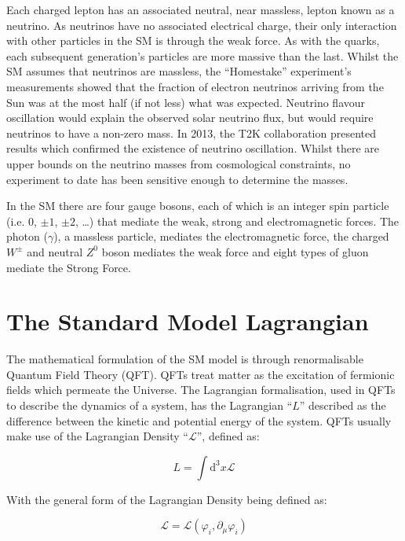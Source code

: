 Each charged lepton has an associated neutral, near massless, lepton known as a neutrino. 
As neutrinos have no associated electrical charge, their only interaction with other particles in the SM is through the weak force. 
As with the quarks, each subsequent generation's particles are more massive than the last. 
Whilst the SM assumes that neutrinos are massless, the ``Homestake'' experiment's measurements showed that the fraction of electron neutrinos arriving from the Sun was at the most half (if not less) what was expected\cite{PhysRevLett.20.1205}. 
Neutrino flavour oscillation would explain the observed solar neutrino flux, but would require neutrinos to have a non-zero mass. 
In 2013, the T2K collaboration presented results which confirmed the existence of neutrino oscillation\cite{PhysRevD.88.032002}. 
Whilst there are upper bounds on the neutrino masses from cosmological constraints, no experiment to date has been sensitive enough to determine the masses\cite{1475-7516-2006-06-019}. 

In the SM there are four gauge bosons, each of which is an integer spin particle (i.e. 0, $\pm 1$, $\pm 2$, …) that mediate the weak, strong and electromagnetic forces. 
The photon ($\gamma$), a massless particle, mediates the electromagnetic force, the charged $W^\pm$ and neutral $Z^0$ boson mediates the weak force and eight types of gluon mediate the Strong Force\cite{LagrangiansSM}. 

\section{The Standard Model Lagrangian}\label{sec:sm-langrangian}

The mathematical formulation of the SM model is through renormalisable Quantum Field Theory (QFT)\cite{LagrangiansSM}. 
QFTs treat matter as the excitation of fermionic fields which permeate the Universe. 
The Lagrangian formalisation, used in QFTs to describe the dynamics of a system, has the Lagrangian ``$L$'' described as the difference between the kinetic and potential energy of the system\cite{LagrangiansSM}. 
QFTs usually make use of the Lagrangian Density ``$\mathcal{L}$'', defined as\cite{QFT}:

\begin{equation}
L = \int \mathrm{d^{3}}x \mathcal{L}
\end{equation}

With the general form of the Lagrangian Density being defined as:

\begin{equation}
\mathcal{L} = \mathcal{L} ( \varphi_{i}, \partial _{\mu} \varphi_{i} )
\end{equation}

